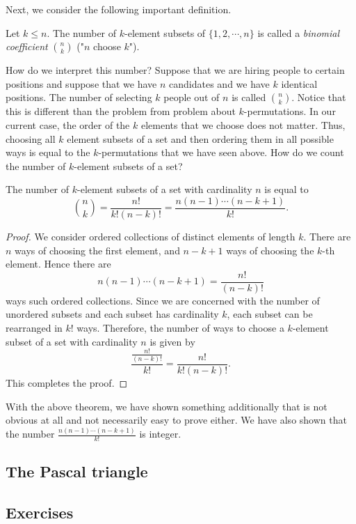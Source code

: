 Next, we consider the following important definition.

\begin{defn}
Let $k \leq n$. The number of $k$-element subsets of $\{1, 2, \cdots, n\}$ is called a \textit{binomial coefficient} ${n \choose k}$ ("$n$ choose $k$").
\end{defn}

How do we interpret this number? Suppose that we are hiring people to certain positions and suppose that we have $n$ candidates and we have $k$ identical positions.
The number of selecting $k$ people out of $n$ is called ${n \choose k}$. Notice that this is different than the problem from problem about $k$-permutations.
In our current case, the order of the $k$ elements that we choose does not matter. Thus, choosing all $k$ element subsets of a set and then ordering them in all possible ways
is equal to the $k$-permutations that we have seen above. How do we count the number of $k$-element subsets of a set?

\begin{theorem}
The number of $k$-element subsets of a set with cardinality $n$ is equal to 
$$
{n \choose k}=\frac{n!}{k!(n-k)!}=\frac{n(n-1)\cdots (n-k+1)}{k!}.
$$
\end{theorem}

\begin{proof}
We consider ordered collections of distinct elements of length $k$. There are $n$ ways of choosing the first element, and $n-k+1$ ways of choosing the $k$-th element.
Hence there are 
$$
n(n-1)\cdots (n-k+1)=\frac{n!}{(n-k)!}
$$
ways such ordered collections. Since we are concerned with the number of unordered subsets and each subset has cardinality $k$, each subset can be rearranged in $k!$ ways.
Therefore, the number of ways to choose a $k$-element subset of a set with cardinality $n$ is given by 
$$
\frac{\frac{n!}{(n-k)!}}{k!}=\frac{n!}{k!(n-k)!}.
$$
This completes the proof.
\end{proof}

With the above theorem, we have shown something additionally that is not obvious at all and not necessarily easy to prove either.
We have also shown that the number $\frac{n(n-1)\cdots (n-k+1)}{k!}$ is integer.

\subsection{The Pascal triangle}

\subsection{Exercises}